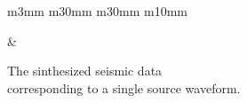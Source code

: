 \begin{figure}[t]
\begin{tabular}{m{3mm} m{30mm} m{30mm} m{10mm}}
\begin{minipage}[b]{\linewidth}
            \caption*{}
        \end{minipage} &
        \hspace{-3mm}
         \\
    \end{tabular}
    \captionsetup{margin=1.3cm}
    \caption{The sinthesized seismic data \\ corresponding to a single source waveform.}
    \label{fig:observed-seismic-data}
\end{figure}
